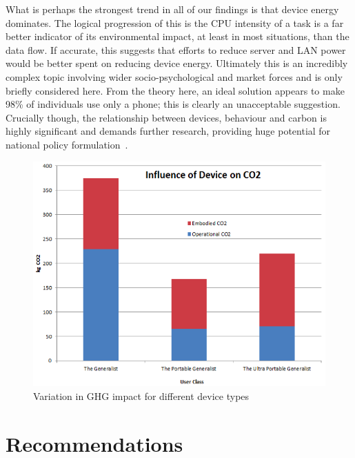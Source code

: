 \documentclass[conference]{IEEEtran}
\begin{document}

What is perhaps the strongest trend in all of our findings is that
device energy dominates. The logical progression of this is the CPU
intensity of a task is a far better indicator of its environmental
impact, at least in most situations, than the data flow. If accurate,
this suggests that efforts to reduce server and LAN power would be
better spent on reducing device energy. Ultimately this is an
incredibly complex topic involving wider socio-psychological and
market forces and is only briefly considered here. From the theory
here, an ideal solution appears to make 98\% of individuals use only a
phone; this is clearly an unacceptable suggestion. Crucially though,
the relationship between devices, behaviour and carbon is highly
significant and demands further research, providing huge potential for
national policy formulation~\cite{smart2020:2008,ruth:2011}.

\begin{figure}
\centering
\includegraphics[width=0.9\columnwidth]{images/ghgimpact_devicetypes.png}
\caption{Variation in GHG impact for different device types}
\label{fig:ghgimpact_devicetype} 
\end{figure}

\section{Recommendations}
\end{document}
